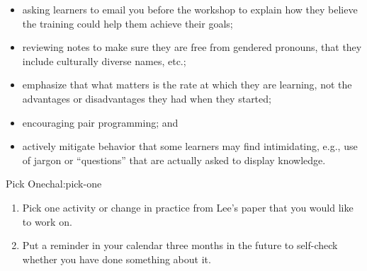 \begin{itemize}
\item
  asking learners to email you before the workshop to explain how they
  believe the training could help them achieve their goals;
\item
  reviewing notes to make sure they are free from gendered pronouns,
  that they include culturally diverse names, etc.;
\item
  emphasize that what matters is the rate at which they are learning,
  not the advantages or disadvantages they had when they started;
\item
  encouraging pair programming; and
\item
  actively mitigate behavior that some learners may find intimidating,
  e.g., use of jargon or ``questions'' that are actually asked to
  display knowledge.
\end{itemize}

\begin{challenge}{Pick One}{chal:pick-one}

\begin{enumerate}
\item
  Pick one activity or change in practice from
  Lee's paper \cite{bib:lee-create-inclusive-community}
  that you would like to work on.
\item
  Put a reminder in your calendar three months in the future to
  self-check whether you have done something about it.
\end{enumerate}
\end{challenge}
